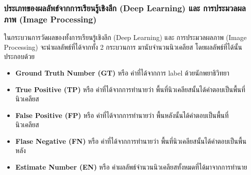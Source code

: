 \documentclass[12pt,oneside,openright,a4paper]{cpe-thai-project}
\begin{document}
\subsubsection{ประเภทของผลลัพธ์จากการเรียนรู้เชิงลึก (Deep Learning) และ การประมวลผลภาพ (Image Processing)}
ในกระบวนการวัดผลของทั้งการเรียนรู้เชิงลึก (Deep Learning) และ การประมวลผลภาพ (Image Processing) จะนำผลลัพธ์ที่ได้จากทั้ง 2 กระบวนการ มานับจำนวนนิวเคลียส โดยผลลัพธ์ที่ได้นั้นประกอบด้วย
\begin{itemize}
    \item \textbf{Ground Truth Number (GT)} หรือ ค่าที่ได้จากการ label ด้วยนักพยาธิวิทยา
    \item \textbf{True Positive (TP)} หรือ ค่าที่ได้จากการทำนายว่า พื้นที่นิวเคลียสนั้นได้คำตอบเป็นพื้นที่นิวเคลียส
    \item \textbf{False Positive (FP)} หรือ ค่าที่ได้จากการทำนายว่า พื้นหลังนั้นได้คำตอบเป็นพื้นที่นิวเคลียส
    \item \textbf{Flase Negative (FN)} หรือ ค่าที่ได้จากการทำนายว่า พื้นที่นิวเคลียสนั้นได้คำตอบเป็นพื้นหลัง
    \item \textbf{Estimate Number (EN)} หรือ ค่าผลลัพธ์จำนวนนิวเคลียสทั้งหมดที่ได้มาจากการทำนาย
\end{itemize}
\end{document}
